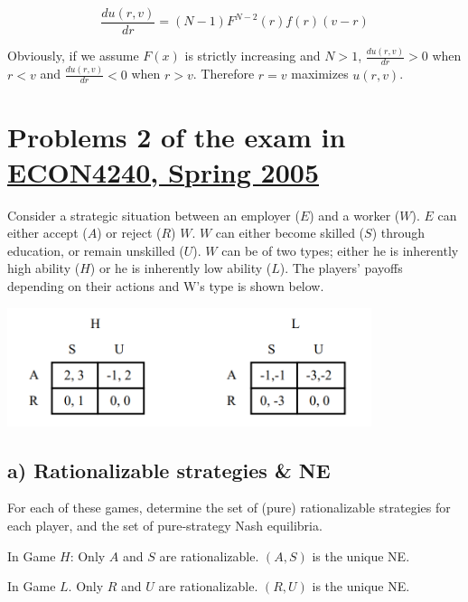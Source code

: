 \documentclass{article}
\begin{document}
\bigskip

$$\frac{du(r,v)}{dr} = (N-1)F^{N-2}(r)f(r)(v-r)$$

Obviously, if we assume $F(x)$ is strictly increasing and $N>1$,
 $\frac{du(r,v)}{dr} > 0$ when $r < v$ and $\frac{du(r,v)}{dr} < 0$ when
$r > v$. Therefore $r=v$ maximizes $u(r,v)$.




\section{Problems 2  of the exam in \href{https://www.uio.no/studier/emner/sv/oekonomi/ECON4240/previous-exams/}{ECON4240, Spring 2005}}

Consider a strategic situation between an employer ($E$) and a worker ($W$). $E$ can either accept
($A$) or reject ($R$) $W$. $W$ can either become skilled ($S$) through education, or remain unskilled
($U$). $W$ can be of two types; either he is inherently high ability ($H$) or he is inherently low
ability ($L$). The players' payoffs depending on their actions and W's type is shown below.

{\centering
\includegraphics[width=0.8\textwidth]{12.q2}
\vspace{2mm}}


\subsection*{a) Rationalizable strategies \& NE} For each of these games, determine the set of (pure) rationalizable strategies for each
player, and the set of pure-strategy Nash equilibria.

\bigskip

In Game $H$: Only $A$ and $S$ are rationalizable. $(A, S)$ is the unique NE. 

In Game $L$. Only $R$ and $U$ are rationalizable. $(R, U)$ is the unique NE.
\end{document}

